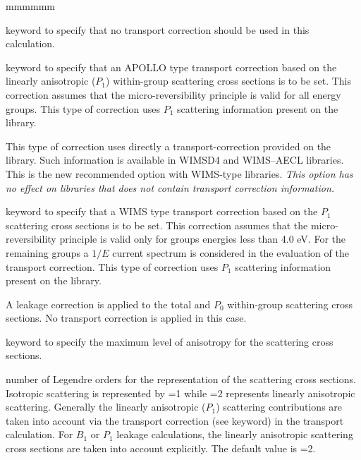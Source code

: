\begin{ListeDeDescription}{mmmmmm}
\item[\moc{NONE}] keyword to specify that no transport correction should be
used in this calculation.

\item[\moc{APOL}] keyword to specify that an APOLLO type transport correction
based on the linearly anisotropic ($P_1$) within-group scattering cross sections is to be set. This correction assumes that
the micro-reversibility principle is valid for all energy groups. This type of
correction uses $P_1$ scattering information present on the library.

\item[\moc{WIMS}] This type of correction uses directly a transport-correction
provided on the library.
Such information is available in WIMSD4 and WIMS--AECL libraries. This is
the new recommended option with WIMS-type libraries. {\sl This option has no effect on
libraries that does not contain transport correction information.}

\item[\moc{OLDW}] keyword to specify that a WIMS type transport
correction based on the $P_1$ scattering cross sections is to be
set. This correction
assumes that the micro-reversibility principle is valid only for groups energies
less than 4.0 eV. For the remaining groups a $1/E$ current spectrum is considered
in the evaluation of the transport correction. This type of correction uses
$P_1$ scattering information present on the library.

\item[\moc{LEAK}] A leakage correction is applied to the total and
$P_0$ within-group scattering cross sections. No transport correction is 
applied in this case.

\item[\moc{ANIS}] keyword to specify the maximum level of anisotropy for the
scattering cross sections.

\item[\dusa{naniso}] number of Legendre orders for the representation of the
scattering cross sections. Isotropic scattering is represented by
=1 while  =2 represents linearly anisotropic
scattering. Generally the linearly anisotropic ($P_1$) scattering contributions are
taken into account via the transport correction (see  keyword) in the
transport calculation. For $B_{1}$ or $P_{1}$ leakage calculations, the linearly
anisotropic scattering cross sections are taken into account explicitly.  The
default value is =2.


\end{ListeDeDescription}
